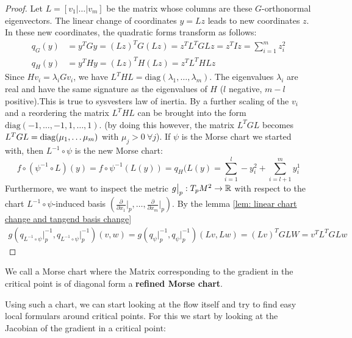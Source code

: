 \begin{proof}
	Let $L = [v_1 | \dots | v_m]$ be the matrix whose columns are these $G$-orthonormal eigenvectors. The linear change of coordinates 
	$y = Lz$ leads to new coordinates $z$. In these new coordinates, the quadratic forms transform as follows:
	\begin{align*}
		q_G(y) &= y^T G y = (Lz)^T G (Lz) = z^T L^T G L z = z^T I z = \sum_{i=1}^m z_i^2 \\
		q_H(y) &= y^T H y = (Lz)^T H (Lz) = z^T L^T H L z
	\end{align*}
	Since $H v_i = \lambda_i G v_i$, we have $L^T H L = \text{diag}(\lambda_1, \dots, \lambda_m)$. The eigenvalues $\lambda_i$ are real and have the same signature as the eigenvalues of $H$ ($l$ negative, $m-l$ positive).This is true to sysvesters law of inertia.  By a further scaling of the $v_i$ and a reordering the matrix $L^T H L$ can be brought into the form $\text{diag}(-1, \dots, -1, 1, \dots, 1)$. (by doing this however, the matrix $L^TGL$ becomes $L^TGL=\mathrm{diag}(\mu_1,\dots \mu_m)$ with $\mu_j>0~\forall j$). If $\psi$ is the Morse chart we started with, then $L^{-1} \circ \psi$ is the new Morse chart: 
	\begin{equation*}
		f\circ (\psi^{-1}\circ L)(y)=f\circ \psi^{-1}(L(y))=q_H(L(y)=\sum_{i=1}^l-y_i^2+\sum_{i=l+1}^my_i^1
	\end{equation*}
	Furthermore, we want to inspect the metric $g\big|_p:T_pM^2\to \mathbb{R}$ with respect to the chart $ L^{-1}\circ \psi $-induced basis $\left( \frac{\partial}{\partial x_1}\big|_p,\dots ,\frac{\partial}{\partial x_m}\big|_p\right)$. By the lemma \ref{lem: linear chart change and tangend basis change}
	\begin{align*}
		g(q_{L^{-1}\circ \psi}\big|_p^{-1},q_{L^{-1}\circ \psi}\big|_p^{-1})(v,w)=	g(q_{\psi}\big|_p^{-1},q_{\psi }\big|_p^{-1})(Lv,Lw)=(Lv)^T G LW=v^T L^TGLw	
	\end{align*}
\end{proof}
\begin{definition}
	We call a Morse chart where the Matrix corresponding to the gradient in the critical point is of diagonal form a \textbf{refined Morse chart}.
\end{definition} 
Using such a chart, we can start looking at the flow itself and try to find easy local formulars around critical points. For this we start by looking at the Jacobian of the gradient in a critical point: 


